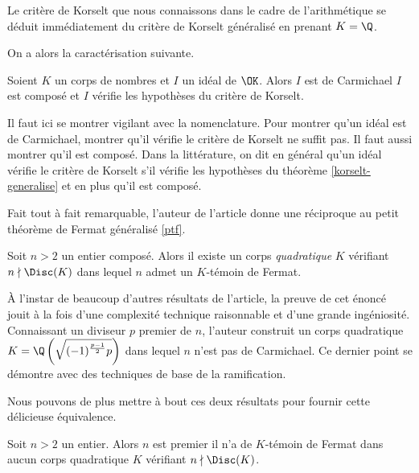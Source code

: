 \begin{remarque}
	Le critère de Korselt que nous connaissons dans le cadre de l'arithmétique se déduit immédiatement du critère de Korselt généralisé en prenant $K=\Q$.
\end{remarque}

On a alors la caractérisation suivante.

\begin{corollaire}
	Soient $K$ un corps de nombres et $I$ un idéal de $\OK$. Alors $I$ est de Carmichael \ssi $I$ est composé et $I$ vérifie les hypothèses du critère de Korselt.
\end{corollaire}

\begin{remarque}
	Il faut ici se montrer vigilant avec la nomenclature. Pour montrer qu'un idéal est de Carmichael, montrer qu'il vérifie le critère de Korselt ne suffit pas. Il faut aussi montrer qu'il est composé. Dans la littérature, on dit en général qu'un idéal vérifie le critère de Korselt s'il vérifie les hypothèses du théorème \ref{korselt-generalise} et en plus qu'il est composé. 
\end{remarque}

Fait tout à fait remarquable, l'auteur de l'article donne une réciproque au petit théorème de Fermat généralisé \ref{ptf}.

\begin{theoreme}
	Soit $n>2$ un entier composé. Alors il existe un corps \emph{quadratique} $K$ vérifiant $n\nmid \Disc(K)$ dans lequel $n$ admet un $K$-témoin de Fermat.
\end{theoreme}

\begin{MotSurPreuve}
	À l'instar de beaucoup d'autres résultats de l'article, la preuve de cet énoncé jouit à la fois d'une complexité technique raisonnable et d'une grande ingéniosité. Connaissant un diviseur $p$ premier de $n$, l'auteur construit un corps quadratique $K = \Q\left(\sqrt{(-1)^\frac{p-1}{2} p}\right)$ dans lequel $n$ n'est pas de Carmichael. Ce dernier point se démontre avec des techniques de base de la ramification. \\
\end{MotSurPreuve}

Nous pouvons de plus mettre à bout ces deux résultats pour fournir cette délicieuse équivalence.

\begin{theoreme}\label{ptf-reciproque}
	Soit $n>2$ un entier. Alors $n$ est premier \ssi il n'a de $K$-témoin de Fermat dans aucun corps quadratique $K$ vérifiant $n\nmid \Disc(K)$.
\end{theoreme}

